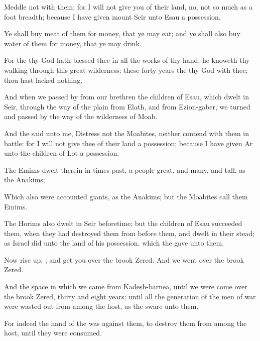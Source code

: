 {Meddle not with them; for I will not
give you of their
land, no, not so much as a
foot
breadth; because I have
given
mount
Seir unto
Esau
{} a
possession.

Ye shall
buy
meat of them for
money, that ye may
eat; and ye shall also
buy
water of them for
money, that ye may
drink.

For the
{} thy
God hath
blessed thee in all the
works of thy
hand: he
knoweth thy
walking through this
great
wilderness: these
forty
years the
{} thy
God
{} with thee; thou hast
lacked
nothing.


\par }{\PP {}And when we
passed by from our
brethren the
children of
Esau, which
dwelt in
Seir, through the
way of the
plain from
Elath, and from
Ezion-gaber, we
turned and
passed by the
way of the
wilderness of
Moab.

And the
{}
said unto me,
Distress not the
Moabites, neither
contend with them in
battle: for I will not
give thee of their
land
{} a
possession; because I have
given
Ar unto the
children of
Lot
{} a
possession.

The
Emims
dwelt therein in times
past, a
people
great, and
many, and
tall, as the
Anakims;

Which also were
accounted
giants, as the
Anakims; but the
Moabites
call them
Emims.

The
Horims also
dwelt in
Seir
beforetime; but the
children of
Esau
succeeded them, when they had
destroyed them from
before them, and
dwelt in their stead; as
Israel
did unto the
land of his
possession, which the
{}
gave unto them.

Now rise
up,
{}, and get you
over the
brook
Zered. And we went
over the
brook
Zered.

And the
space in which we
came from
Kadesh-barnea, until we were come
over the
brook
Zered,
{}
thirty and
eight
years; until all the
generation of the
men of
war were wasted
out from
among the
host, as the
{}
sware unto them.

For indeed the
hand of the
{} was against them, to
destroy them from
among the
host, until they were
consumed.


}
